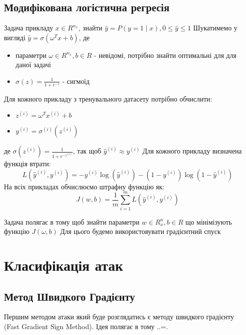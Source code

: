 \documentclass[a4paper,14pt]{extreport}
\newcommand{\tran}{^{T}}
\newcommand{\ith}{^{(i)}}
\begin{document}
	\section{Модифікована логістична регресія}
	Задача прикладу $x \in R^{n_x}$, знайти $\hat{y}=P(y = 1 \mid x), 0 \leq \hat{y} \leq 1$
	Шукатимемо у вигляді $\hat{y} = \sigma (\omega\tran x + b)$, де
	\begin{itemize}
		\item параметри $\omega \in R^{n_x}, b \in R$ - невідомі, потрібно знайти оптимальні для для даної задачі
		\item $\sigma(z) = \frac{1}{1+ e^{-z}}$ - сигмоїд
	\end{itemize}
	Для кожного прикладу з тренувального датасету потрібно обчислити:
	\begin{itemize}
		\item $ z\ith = \omega\tran x\ith + b $
		\item $ y\ith = \sigma\ith (z\ith) $
	\end{itemize}
	де $\sigma(z\ith) = \frac{1}{1 + e^{-z\ith}}$, так щоб $\hat{y}\ith \approx y\ith $ \newline
	Для кожного прикладу визначена функція втрати:
	$$L(\hat{y}\ith, y\ith) = -y\ith \log(\hat{y}\ith) - (1 - y\ith) \log(1 - \hat{y}\ith)$$
	На всіх прикладах обчислюємо штрафну функцію як:
	$$J(w, b) = \frac{1}{m} \sum_{i=1}^{m} L(\hat{y}\ith, y\ith)$$
	
	Задача полягає в тому щоб знайти параметри $w \in R^n_x, b\in R$ що мінімізують функцію $J(\omega, b)$
	Для цього будемо використовувати градієнтний спуск 
	
	
	


	\chapter{Класифікація атак} 
	\section{Метод Швидкого Градієнту} 
	Першим методом атаки який буде розглядатись є методу швидкого градієнту (Fast Gradient Sign Method).
	Ідея полягає в тому ..=.
	
\end{document}
